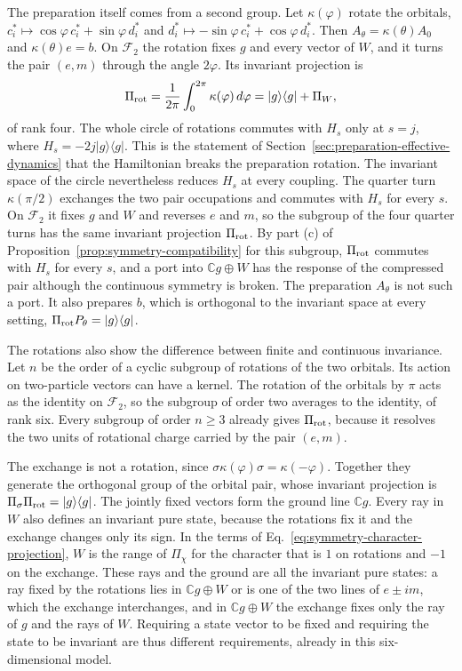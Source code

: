 \documentclass[11pt]{article}
\theoremstyle{definition}
\newcommand{\C}{\mathbb C}
\newcommand{\ket}[1]{\lvert #1\rangle}
\newcommand{\bra}[1]{\langle #1\rvert}
\begin{document}
The preparation itself comes from a second group. Let $\kappa(\varphi)$ rotate the orbitals, $c_i^*\mapsto\cos\varphi\,c_i^*+\sin\varphi\,d_i^*$ and $d_i^*\mapsto-\sin\varphi\,c_i^*+\cos\varphi\,d_i^*$. Then $A_\theta=\kappa(\theta)A_0$ and $\kappa(\theta)e=b$. On $\mathcal F_2$ the rotation fixes $g$ and every vector of $W$, and it turns the pair $(e,m)$ through the angle $2\varphi$. Its invariant projection is
\begin{equation}
 \Pi_{\rm rot}=\frac1{2\pi}\int_0^{2\pi}\kappa(\varphi)\,d\varphi=\ket{g}\bra{g}+\Pi_W ,
 \label{eq:symmetry-pair-rotation}
\end{equation}
of rank four. The whole circle of rotations commutes with $H_s$ only at $s=j$, where $H_s=-2j\ket{g}\bra{g}$. This is the statement of Section~\ref{sec:preparation-effective-dynamics} that the Hamiltonian breaks the preparation rotation. The invariant space of the circle nevertheless reduces $H_s$ at every coupling. The quarter turn $\kappa(\pi/2)$ exchanges the two pair occupations and commutes with $H_s$ for every $s$. On $\mathcal F_2$ it fixes $g$ and $W$ and reverses $e$ and $m$, so the subgroup of the four quarter turns has the same invariant projection $\Pi_{\rm rot}$. By part (c) of Proposition~\ref{prop:symmetry-compatibility} for this subgroup, $\Pi_{\rm rot}$ commutes with $H_s$ for every $s$, and a port into $\C g\oplus W$ has the response of the compressed pair although the continuous symmetry is broken. The preparation $A_\theta$ is not such a port. It also prepares $b$, which is orthogonal to the invariant space at every setting, $\Pi_{\rm rot}P_\theta=\ket{g}\bra{g}$.

The rotations also show the difference between finite and continuous invariance. Let $n$ be the order of a cyclic subgroup of rotations of the two orbitals. Its action on two-particle vectors can have a kernel. The rotation of the orbitals by $\pi$ acts as the identity on $\mathcal F_2$, so the subgroup of order two averages to the identity, of rank six. Every subgroup of order $n\geq3$ already gives $\Pi_{\rm rot}$, because it resolves the two units of rotational charge carried by the pair $(e,m)$.

The exchange is not a rotation, since $\sigma\kappa(\varphi)\sigma=\kappa(-\varphi)$. Together they generate the orthogonal group of the orbital pair, whose invariant projection is $\Pi_\sigma\Pi_{\rm rot}=\ket{g}\bra{g}$. The jointly fixed vectors form the ground line $\C g$. Every ray in $W$ also defines an invariant pure state, because the rotations fix it and the exchange changes only its sign. In the terms of Eq.~\eqref{eq:symmetry-character-projection}, $W$ is the range of $\Pi_\chi$ for the character that is $1$ on rotations and $-1$ on the exchange. These rays and the ground are all the invariant pure states: a ray fixed by the rotations lies in $\C g\oplus W$ or is one of the two lines of $e\pm im$, which the exchange interchanges, and in $\C g\oplus W$ the exchange fixes only the ray of $g$ and the rays of $W$. Requiring a state vector to be fixed and requiring the state to be invariant are thus different requirements, already in this six-dimensional model.
\end{document}
